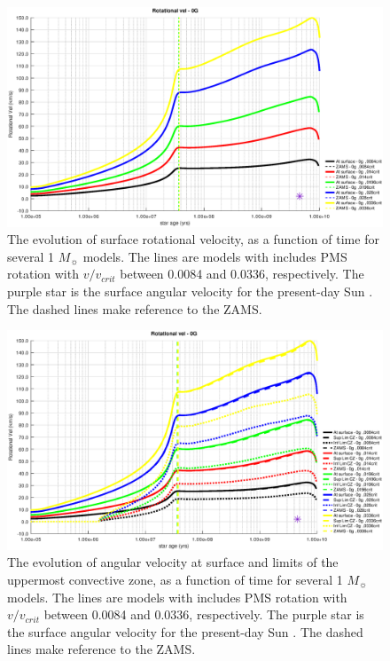 \documentclass[fleqn,usenatbib]{mnras}
\begin{document}
\begin{figure}
	\includegraphics[width=\columnwidth]{figures/rot_vel_0g.eps}
    \caption{The evolution of surface rotational velocity, as a function of time for several 1 $M_{\sun}$ models. The lines are models with includes PMS rotation with $v/v_{crit}$ between 0.0084 and 0.0336, respectively. The purple star is the surface angular velocity for the present-day Sun \citep{Gill2012}. The dashed lines make reference to the ZAMS.}
    \label{fig:rot_vel_0g}
\end{figure}

\begin{figure}
	\includegraphics[width=\columnwidth]{figures/rot_vel_cz_0g.eps}
    \caption{The evolution of angular velocity at surface and limits of the uppermost convective zone, as a function of time for several 1 $M_{\sun}$ models. The lines are models with includes PMS rotation with $v/v_{crit}$ between 0.0084 and 0.0336, respectively. The purple star is the surface angular velocity for the present-day Sun \citep{Gill2012}. The dashed lines make reference to the ZAMS.}
    \label{fig:rot_vel_cz_0g}
\end{figure}
\end{document}
